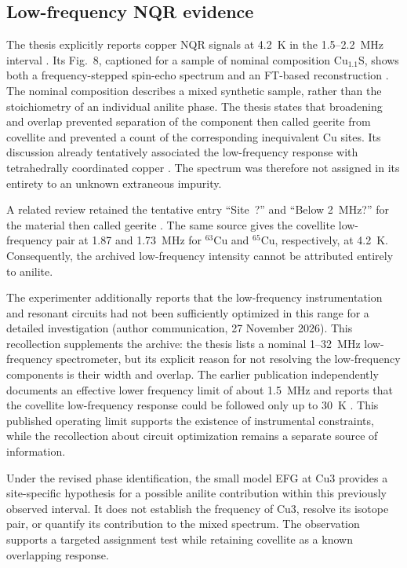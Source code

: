 \subsection{Low-frequency NQR evidence}

The thesis explicitly reports copper NQR signals at 4.2~K in the
1.5--2.2~MHz interval \citep[p.~22]{Evlampiev2009}.
Its Fig.~8, captioned for a sample of nominal composition
Cu$_{1.1}$S, shows both a frequency-stepped spin-echo spectrum and an
FT-based reconstruction \citep[p.~23]{Evlampiev2009}.
The nominal composition describes a mixed synthetic sample, rather than
the stoichiometry of an individual anilite phase.
The thesis states that broadening and overlap prevented separation of
the component then called geerite from covellite and prevented a count
of the corresponding inequivalent Cu sites.
Its discussion already tentatively associated the low-frequency response
with tetrahedrally coordinated copper \citep[p.~33]{Evlampiev2009}.
The spectrum was therefore not assigned in its entirety to an unknown
extraneous impurity.

A related review retained the tentative entry ``Site~?'' and
``Below 2~MHz?'' for the material then called geerite
\citep[Table~I, p.~332]{Gainov2010}.
The same source gives the covellite low-frequency pair at 1.87 and
1.73~MHz for $^{63}$Cu and $^{65}$Cu, respectively, at 4.2~K.
Consequently, the archived low-frequency intensity cannot be attributed
entirely to anilite.

The experimenter additionally reports that the low-frequency
instrumentation and resonant circuits had not been sufficiently optimized in
this range for a detailed investigation (author communication,
27 November 2026). This recollection supplements the archive:
the thesis lists a nominal 1--32~MHz low-frequency spectrometer, but its
explicit reason for not resolving the low-frequency components is their
width and overlap.
The earlier publication independently documents an effective lower
frequency limit of about 1.5~MHz and reports that the covellite
low-frequency response could be followed only up to 30~K
\citep{Gainov2009}. This published operating limit supports the existence
of instrumental constraints, while the recollection about circuit
optimization remains a separate source of information.

Under the revised phase identification, the small model EFG at Cu3
provides a site-specific hypothesis for a possible anilite contribution
within this previously observed interval. It does not establish the
frequency of Cu3, resolve its isotope pair, or quantify its contribution
to the mixed spectrum. The observation supports a targeted assignment
test while retaining covellite as a known overlapping response.
